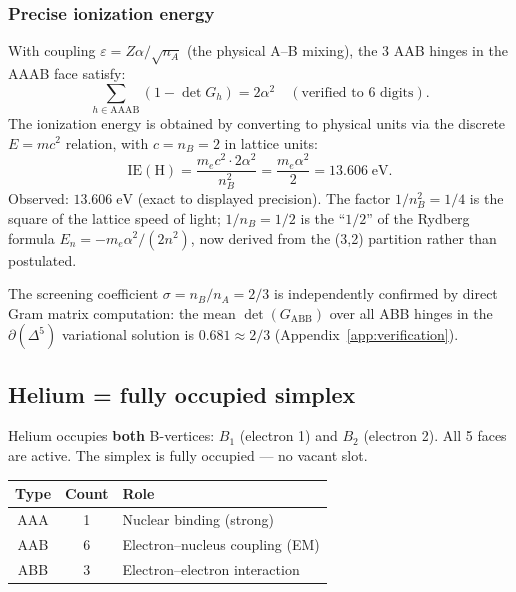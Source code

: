 \subsubsection{Precise ionization energy}

With coupling $\varepsilon = Z\alpha/\sqrt{n_A}$ (the physical A--B mixing), the 3 AAB hinges in the AAAB face satisfy:
\begin{equation}
\sum_{h \in \mathrm{AAAB}}(1 - \det G_h) = 2\alpha^2
\quad (\text{verified to 6 digits}).
\end{equation}
The ionization energy is obtained by converting to physical units via the discrete $E = mc^2$ relation, with $c = n_B = 2$ in lattice units:
\begin{equation}
\boxed{\text{IE}(\text{H}) = \frac{m_e c^2 \cdot 2\alpha^2}{n_B^2} = \frac{m_e \alpha^2}{2} = 13.606\;\text{eV}.}
\end{equation}
Observed: $13.606\;\text{eV}$ (exact to displayed precision).  The factor $1/n_B^2 = 1/4$ is the square of the lattice speed of light; $1/n_B = 1/2$ is the ``$1/2$'' of the Rydberg formula $E_n = -m_e\alpha^2/(2n^2)$, now derived from the (3,2) partition rather than postulated.

\begin{remark}
The screening coefficient $\sigma = n_B/n_A = 2/3$ is independently confirmed by direct Gram matrix computation: the mean $\det(G_\mathrm{ABB})$ over all ABB hinges in the $\partial(\Delta^5)$ variational solution is $0.681 \approx 2/3$ (Appendix~\ref{app:verification}).
\end{remark}

\subsection{Helium = fully occupied simplex}

Helium occupies \textbf{both} B-vertices: $B_1$ (electron 1) and $B_2$ (electron 2). All 5 faces are active. The simplex is fully occupied --- no vacant slot.

\begin{center}
\begin{tabular}{ccl}
\hline
Type & Count & Role \\
\hline
AAA & 1 & Nuclear binding (strong) \\
AAB & 6 & Electron--nucleus coupling (EM) \\
ABB & 3 & Electron--electron interaction \\
\hline
\end{tabular}
\end{center}

